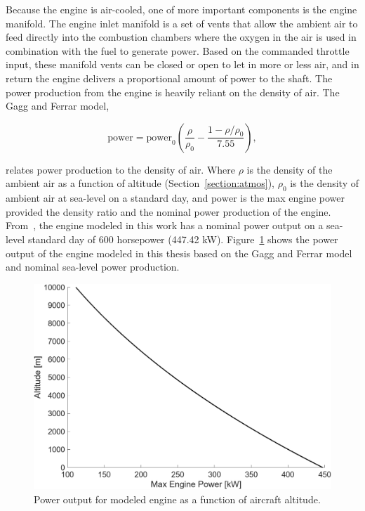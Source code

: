 Because the engine is air-cooled, one of more important components is the engine manifold. The engine inlet manifold is a set of vents that allow the ambient air to feed directly into the combustion chambers where the oxygen in the air is used in combination with the fuel to generate power. Based on the commanded throttle input, these manifold vents can be closed or open to let in more or less air, and in return the engine delivers a proportional amount of power to the shaft. The power production from the engine is heavily reliant on the density of air. The Gagg and Ferrar model,

\begin{equation}\label{eq:gaggandferrar}
    \textrm{power} = \textrm{power}_{0}\left(\frac{\rho}{\rho_0} - \frac{1 - \rho/\rho_0}{7.55}\right),
\end{equation}

relates power production to the density of air. Where \(\rho\) is the density of the ambient air as a function of altitude (Section~\ref{section:atmos}), \(\rho_0\) is the density of ambient air at sea-level on a standard day, and \(\textrm{power}\) is the max engine power provided the density ratio and the nominal power production of the engine. From~\cite{hartzellpropellerHartzellPropellerManual2023}, the engine modeled in this work has a nominal power output on a sea-level standard day of 600 horsepower (447.42 kW). Figure~\ref{fig:gaggferrar} shows the power output of the engine modeled in this thesis based on the Gagg and Ferrar model and nominal sea-level power production.

\begin{figure}[!ht]\label{fig:gaggferrar}
    \centering
    \includegraphics[width=0.85\linewidth]{Figures/gaggferrar.png}
    \caption{Power output for modeled engine as a function of aircraft altitude.}
\end{figure}

